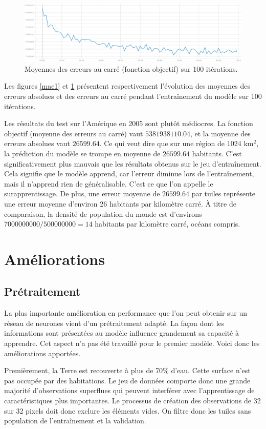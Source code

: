 \documentclass[a4paper, 11pt]{report}
\begin{document}
\begin{figure}
	\centering
	\includegraphics[width=1.0\textwidth]{img/mse1.png}
	\caption{Moyennes des erreurs au carré (fonction objectif) sur 100 itérations.}
	\label{mse1}
\end{figure}

Les figures \ref{mae1} et \ref{mse1} présentent respectivement l'évolution des moyennes des erreurs absolues et des erreurs au carré pendant l'entraînement du modèle sur 100 itérations.

Les résultats du test sur l'Amérique en 2005 sont plutôt médiocres. La fonction objectif (moyenne des erreurs au carré) vaut $5381938110.04$, et la moyenne des erreurs absolues vaut $26599.64$. Ce qui veut dire que sur une région de 1024 km$^2$, la prédiction du modèle se trompe en moyenne de $26599.64$ habitants. C'est significativement plus mauvais que les résultats obtenus sur le jeu d'entraînement. Cela signifie que le modèle apprend, car l'erreur diminue lors de l'entraînement, mais il n'apprend rien de généralisable. C'est ce que l'on appelle le surapprentissage. De plus, une erreur moyenne de $26599.64$ par tuiles représente une erreur moyenne d'environ 26 habitants par kilomètre carré. À titre de comparaison, la densité de population du monde est d'environs $7000000000/500000000 = 14$ habitants par kilomètre carré, océans compris.

\section{Améliorations}
\subsection{Prétraitement}
La plus importante amélioration en performance que l'on peut obtenir sur un réseau de neurones vient d'un prétraitement adapté. La façon dont les informations sont présentées au modèle influence grandement sa capacité à apprendre. Cet aspect n'a pas été travaillé pour le premier modèle. Voici donc les améliorations apportées.

Premièrement, la Terre est recouverte à plus de 70\% d'eau. Cette surface n'est pas occupée par des habitations. Le jeu de données comporte donc une grande majorité d'observations superflues qui peuvent interférer avec l'apprentissage de caractéristiques plus importantes. Le processus de création des observations de 32 sur 32 pixels doit donc exclure les éléments vides. On filtre donc les tuiles sans population de l'entraînement et la validation.
\end{document}
